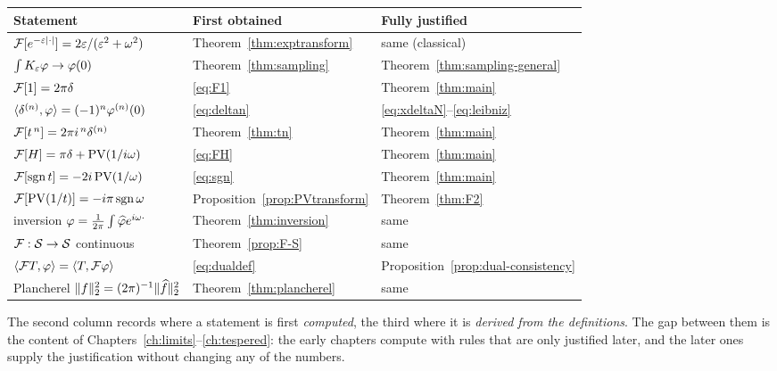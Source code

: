 \begin{center}
\small
\begin{tabular}{@{}lll@{}}
\toprule
Statement & First obtained & Fully justified \\
\midrule
$\mathcal{F}[e^{-\varepsilon|\cdot|}]=2\varepsilon/(\varepsilon^{2}+\omega^{2})$ & Theorem~\ref{thm:exptransform} & same (classical) \\
$\int K_{\varepsilon}\varphi\to\varphi(0)$ & Theorem~\ref{thm:sampling} & Theorem~\ref{thm:sampling-general} \\
$\mathcal{F}[1]=2\pi\delta$ & \eqref{eq:F1} & Theorem~\ref{thm:main} \\
$\langle \delta^{(n)},\varphi\rangle=(-1)^{n}\varphi^{(n)}(0)$ & \eqref{eq:deltan} & \eqref{eq:xdeltaN}--\eqref{eq:leibniz} \\
$\mathcal{F}[t^{\,n}]=2\pi i^{\,n}\delta^{(n)}$ & Theorem~\ref{thm:tn} & Theorem~\ref{thm:main} \\
$\mathcal{F}[H]=\pi\delta+\operatorname{PV}(1/i\omega)$ & \eqref{eq:FH} & Theorem~\ref{thm:main} \\
$\mathcal{F}[\operatorname{sgn} t]=-2i\operatorname{PV}(1/\omega)$ & \eqref{eq:sgn} & Theorem~\ref{thm:main} \\
$\mathcal{F}[\operatorname{PV}(1/t)]=-i\pi\operatorname{sgn}\omega$ & Proposition~\ref{prop:PVtransform} & Theorem~\ref{thm:F2} \\
inversion $\varphi=\frac{1}{2\pi}\int\widehat{\varphi} e^{i\omega\cdot}$ & Theorem~\ref{thm:inversion} & same \\
$\mathcal{F}:\mathcal{S}\to\mathcal{S}$ continuous & Theorem~\ref{prop:F-S} & same \\
$\langle \mathcal{F} T,\varphi\rangle=\langle T,\mathcal{F}\varphi\rangle$ & \eqref{eq:dualdef} & Proposition~\ref{prop:dual-consistency} \\
Plancherel $\|f\|_{2}^{2}=(2\pi)^{-1}\|\widehat{f}\|_{2}^{2}$ & Theorem~\ref{thm:plancherel} & same \\
\bottomrule
\end{tabular}
\end{center}

The second column records where a statement is first \emph{computed}, the third where it is
\emph{derived from the definitions}. The gap between them is the content of
Chapters~\ref{ch:limits}--\ref{ch:tespered}: the early chapters compute with rules that are only
justified later, and the later ones supply the justification without changing any of the numbers.

